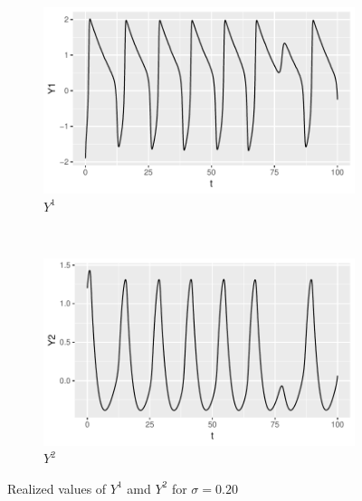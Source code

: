 \documentclass[a4paper]{article}
\begin{document}
\begin{figure}
    \centering
    \begin{subfigure}[b]{0.45\textwidth}
        \includegraphics[width=\textwidth]{part1a-sigma2-Y1.pdf}
        \caption{$Y^1$}
    \end{subfigure}
    ~
    \begin{subfigure}[b]{0.45\textwidth}
        \includegraphics[width=\textwidth]{part1a-sigma2-Y2.pdf}
        \caption{$Y^2$}
    \end{subfigure}
    \caption{Realized values of $Y^1$ amd $Y^2$ for $\sigma = 0.20$}\label{fig:part1a-sigma2}
\end{figure}
\end{document}
